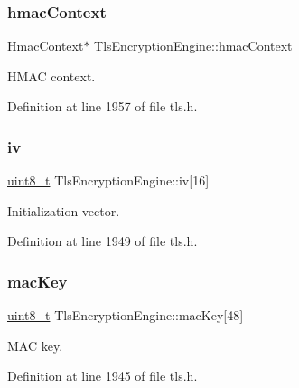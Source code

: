 \subsubsection{\texorpdfstring{hmac\+Context}{hmacContext}}
{\footnotesize\ttfamily \hyperlink{structHmacContext}{Hmac\+Context}$\ast$ Tls\+Encryption\+Engine\+::hmac\+Context}



H\+M\+AC context. 



Definition at line 1957 of file tls.\+h.

\mbox{\label{structTlsEncryptionEngine_af7dda7e3510e4e13458a16c5357143f7}} 
\subsubsection{\texorpdfstring{iv}{iv}}
{\footnotesize\ttfamily \hyperlink{stdint_8h_aba7bc1797add20fe3efdf37ced1182c5}{uint8\+\_\+t} Tls\+Encryption\+Engine\+::iv\mbox{[}16\mbox{]}}



Initialization vector. 



Definition at line 1949 of file tls.\+h.

\mbox{\label{structTlsEncryptionEngine_addc5682b60f0e934f1b838909b8aea7c}} 
\subsubsection{\texorpdfstring{mac\+Key}{macKey}}
{\footnotesize\ttfamily \hyperlink{stdint_8h_aba7bc1797add20fe3efdf37ced1182c5}{uint8\+\_\+t} Tls\+Encryption\+Engine\+::mac\+Key\mbox{[}48\mbox{]}}



M\+AC key. 



Definition at line 1945 of file tls.\+h.

\mbox{\label{structTlsEncryptionEngine_a26e44e1dbfb86e7a0f118dc4d859d7ab}} 
